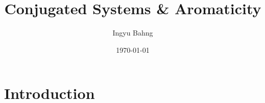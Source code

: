 \documentclass[10pt]{article}
\title{Conjugated Systems \& Aromaticity}
\date{\today}
\author{Ingyu Bahng}
\begin{document}


\section{Introduction}
\end{document}
